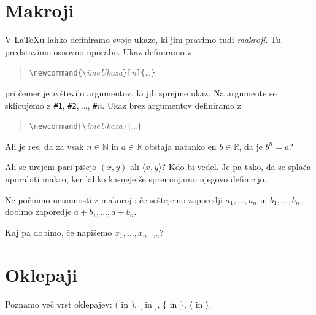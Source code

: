 \documentclass{amsart}
\begin{document}
\section{Makroji}
\label{sec:makroji}

V {\LaTeX}u lahko definiramo svoje ukaze, ki jim pravimo tudi \emph{makroji}. Tu
predstavimo osnovno uporabo. Ukaz definiramo z
%
\begin{quote}
  \verb|\newcommand{\|\emph{imeUkaza}\verb|}[|\emph{n}\verb|]{|\dots\verb|}|
\end{quote}
%
pri čemer je \emph{n} število argumentov, ki jih sprejme ukaz. Na argumente se sklicujemo
z \verb|#1|, \verb|#2|, \dots, \verb|#|\emph{n}. Ukaz brez argumentov definiramo z
%
\begin{quote}
  \verb|\newcommand{\|\emph{imeUkaza}\verb|}{|\dots\verb|}|
\end{quote}
%


\newcommand{\RR}{\mathbb{R}} %
\newcommand{\NN}{\mathbb{N}} %

Ali je res, da za vsak $n \in \NN$ in $a \in \RR$ obstaja natanko en $b \in \RR$, da je $b^n = a$?

\newcommand{\pair}[1]{\langle #1 \rangle}

Ali se urejeni pari pišejo $(x, y)$ ali $\pair{x, y}$? Kdo bi vedel. Je pa tako, da se
splača uporabiti makro, ker lahko kasneje še spreminjamo njegovo definicijo.

\newcommand{\zap}[2]{#1_1, \ldots, #1_{#2}}

Ne počnimo neumnosti z makoroji: če seštejemo zaporedji $\zap{a}{n}$ in $\zap{b}{n}$,
dobimo zaporedje $\zap{a + b}{n}$.

Kaj pa dobimo, če napišemo $\zap{x}{n + m}$?

\section{Oklepaji}
\label{sec:oklepaji}

Poznamo več vrst oklepajev: $($ in $)$, $[$ in $]$, $\{$ in $\}$, $\langle$ in $\rangle$.
\end{document}
